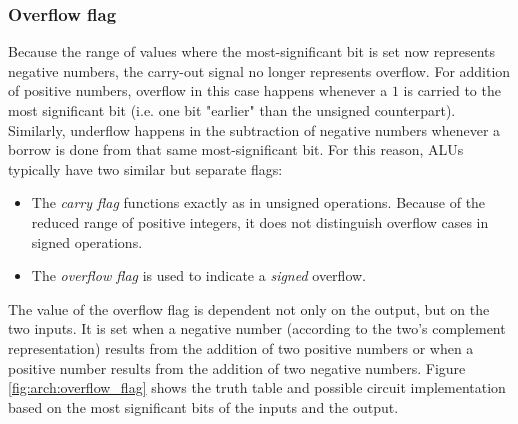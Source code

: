 \subsubsection{Overflow flag}

Because the range of values where the most-significant bit is set now represents
negative numbers, the carry-out signal no longer represents overflow.  For
addition of positive numbers, overflow in this case happens whenever a $1$ is
carried to the most significant bit (i.e. one bit "earlier" than the unsigned
counterpart).  Similarly, underflow happens in the subtraction of negative
numbers whenever a borrow is done from that same most-significant bit.  For this
reason, ALUs typically have two similar but separate flags:

\begin{itemize}
    \item
        The \textit{carry flag} functions exactly as in unsigned operations.
        Because of the reduced range of positive integers, it does not
        distinguish overflow cases in signed operations.
    \item
        The \textit{overflow flag} is used to indicate a \emph{signed} overflow.
\end{itemize}

The value of the overflow flag is dependent not only on the output, but on the
two inputs.  It is set when a negative number (according to the two's complement
representation) results from the addition of two positive numbers or when a
positive number results from the addition of two negative numbers.  Figure
\ref{fig:arch:overflow_flag} shows the truth table and possible circuit
implementation based on the most significant bits of the inputs and the
output\footnotemark.


